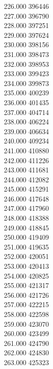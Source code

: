{ 226.000	396446 \\
 227.000	396790 \\
 228.000	397251 \\
 229.000	397624 \\
 230.000	398156 \\
 231.000	398473 \\
 232.000	398953 \\
 233.000	399423 \\
 234.000	399873 \\
 235.000	400239 \\
 236.000	401435 \\
 237.000	404714 \\
 238.000	406224 \\
 239.000	406634 \\
 240.000	409234 \\
 241.000	410880 \\
 242.000	411226 \\
 243.000	411681 \\
 244.000	412082 \\
 245.000	415291 \\
 246.000	417648 \\
 247.000	417960 \\
 248.000	418388 \\
 249.000	418845 \\
 250.000	419409 \\
 251.000	419635 \\
 252.000	420051 \\
 253.000	420413 \\
 254.000	420825 \\
 255.000	421317 \\
 256.000	421726 \\
 257.000	422215 \\
 258.000	422598 \\
 259.000	423070 \\
 260.000	423499 \\
 261.000	424790 \\
 262.000	424830 \\
 263.000	425323 \\
}
